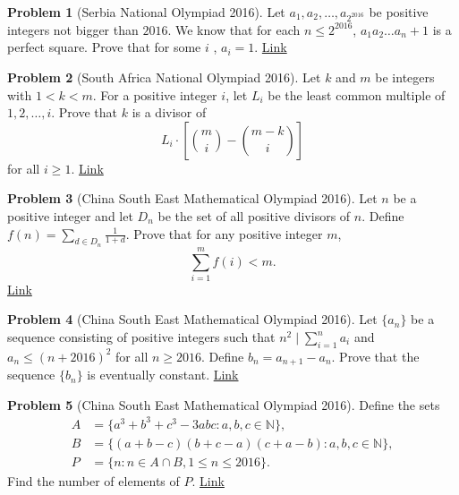 \documentclass[]{article}
\theoremstyle{definition}
\newtheorem{problem}{Problem}
\begin{document}
\begin{problem}[Serbia National Olympiad 2016]
	Let $a_1, a_2, \dots, a_{2^{2016}}$ be positive integers not bigger than $2016$. We know that for each $n \leq 2^{2016}$, $a_1a_2 \dots a_{n} +1 $ is a perfect square. Prove that for some $i $ , $a_i=1$. \hfill \href{http://artofproblemsolving.com/community/c6h1221134p6106775}{Link}
\end{problem}



\begin{problem}[South Africa National Olympiad 2016]
	Let $k$ and $m$ be integers with $1 < k < m$. For a positive integer $i$, let $L_i$ be the least common multiple of $1,2,\ldots,i$.
	Prove that $k$ is a divisor of $$L_i \cdot \left[\binom{m}{i} - \binom{m-k}{i}\right]$$ for all $i \geq 1$. \hfill \href{http://artofproblemsolving.com/community/c6h1310094p7016426}{Link}
\end{problem}



\begin{problem}[China South East Mathematical Olympiad 2016]
	Let $n$ be a positive integer and let $D_n$ be the set of all positive divisors of $n$. Define $f(n)=\sum\limits_{d\in D_n}{\frac{1}{1+d}}$.
	Prove that for any positive integer $m$, $$\sum_{i=1}^{m}{f(i)} <m.$$
	\flushright \href{http://artofproblemsolving.com/community/c6h1281358p6741745}{Link}
\end{problem}



\begin{problem}[China South East Mathematical Olympiad 2016]
	Let $\{ a_n\}$ be a sequence consisting of positive integers such that $n^2 \mid \sum_{i=1}^{n}{a_i}$ and $a_n\leq (n+2016)^2$ for all $n\geq 2016$.
	Define $b_n=a_{n+1}-a_n$. Prove that the sequence $\{ b_n\}$ is eventually constant. \hfill \href{http://artofproblemsolving.com/community/c6h1281364p6741764}{Link}
\end{problem}



\begin{problem}[China South East Mathematical Olympiad 2016]
	Define the sets 
		\begin{align*}
			A &=\{a^3+b^3+c^3-3abc:a,b,c\in\mathbb{N}\}, \\
			B &=\{(a+b-c)(b+c-a)(c+a-b):a,b,c\in\mathbb{N}\},\\
			P &=\{n:n\in A\cap B,1\le n\le 2016\}.
		\end{align*}
	Find the number of elements of $P$. \href{http://artofproblemsolving.com/community/c6h1285319p6774603}{Link}
\end{problem}
\end{document}
